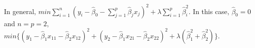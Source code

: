 \documentclass[10pt]{article}
\begin{document}
In general, $min\sum\limits_{i=1}^n {(y_i - \hat{\beta}_0 - \sum\limits_{j=1}^p {\hat{\beta}_jx_j} )^2} + \lambda \sum\limits_{i=1}^p \hat{\beta}_i^2
$. In this case, $\hat{\beta}_0 = 0$ and $n = p = 2$, $min\{(y_1 - \hat{\beta}_1x_{11} - \hat{\beta}_2x_{12})^2 + (y_2 - \hat{\beta}_1x_{21} - \hat{\beta}_2x_{22})^2 + \lambda (\hat{\beta}_1^2 + \hat{\beta}_2^2)\}$.
\end{document}

